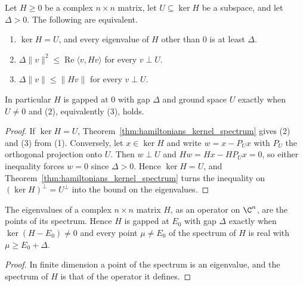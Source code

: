 \begin{theorem}
    \label{thm:hamiltonians_subspace_gap}
    \leanok
    Let $H\ge0$ be a complex $n\times n$ matrix, let $U\subseteq\ker H$ be a
    subspace, and let $\Delta>0$. The following are equivalent.
    \begin{enumerate}
        \item $\ker H=U$, and every eigenvalue of $H$ other than $0$ is at least
              $\Delta$.
        \item $\Delta\lVert v\rVert^2\le\operatorname{Re}\langle v,Hv\rangle$ for
              every $v\perp U$.
        \item $\Delta\lVert v\rVert\le\lVert Hv\rVert$ for every $v\perp U$.
    \end{enumerate}
    In particular $H$ is gapped at $0$ with gap $\Delta$ and ground space $U$
    exactly when $U\neq0$ and (2), equivalently (3), holds.
\end{theorem}
\begin{proof}\leanok
    If $\ker H=U$, Theorem~\ref{thm:hamiltonians_kernel_spectrum} gives (2) and (3)
    from (1). Conversely, let $x\in\ker H$ and write $w=x-P_Ux$ with $P_U$ the
    orthogonal projection onto $U$. Then $w\perp U$ and $Hw=Hx-HP_Ux=0$, so either
    inequality forces $w=0$ since $\Delta>0$. Hence $\ker H=U$, and
    Theorem~\ref{thm:hamiltonians_kernel_spectrum} turns the inequality on
    $(\ker H)^\perp=U^\perp$ into the bound on the eigenvalues.
\end{proof}

\begin{lemma}
    \label{lem:hamiltonians_gap_spectrum}
    \leanok
    The eigenvalues of a complex $n\times n$ matrix $H$, as an operator on $\C^n$,
    are the points of its spectrum. Hence $H$ is gapped at $E_0$ with gap $\Delta$
    exactly when $\ker(H-E_0)\neq0$ and every point $\mu\neq E_0$ of the spectrum
    of $H$ is real with $\mu\ge E_0+\Delta$.
\end{lemma}
\begin{proof}\leanok
    In finite dimension a point of the spectrum is an eigenvalue, and the
    spectrum of $H$ is that of the operator it defines.
\end{proof}

